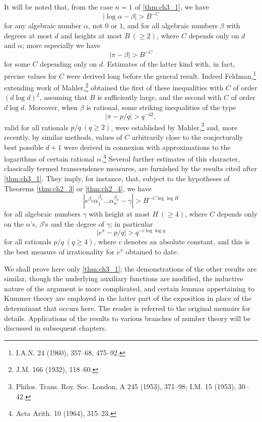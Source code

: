 It will be noted that, from the case $n = 1$ of \autoref{thm:ch3_1}, we have
\[
|\log \alpha - \beta| > B^{-C}
\]
for any algebraic number $\alpha$, not $0$ or $1$, and for all algebraic numbers $\beta$ with degrees at most $d$ and heights at most $B \ (\ge 2)$, where $C$ depends only on $d$ and $\alpha$; more especially we have
\[
|\pi - \beta| > B^{-C}
\]
for some $C$ depending only on $d$. Estimates of the latter kind with, in fact, precise values for $C$ were derived long before the general result. Indeed Feldman,\footnote{I.A.N. 24 (1960), 357--68, 475--92.} extending work of Mahler,\footnote{J.M. 166 (1932), 118--60.} obtained the first of these inequalities with $C$ of order $(d \log d)^2$, assuming that $B$ is sufficiently large, and the second with $C$ of order $d \log d$. Moreover, when $\beta$ is rational, some striking inequalities of the type
\[
|\pi-p/q| > q^{-42},
\]
valid for all rationals $p/q \ (q \ge 2)$, were established by Mahler,\footnote{Philos. Trans. Roy. Soc. London, A 245 (1953), 371--98; I.M. 15 (1953), 30--42.} and, more recently, by similar methods, values of $C$ arbitrarily close to the conjecturally best possible $d+1$ were derived in connexion with approximations to the logarithms of certain rational $\alpha$.\footnote{Acta Arith. 10 (1964), 315--23.} Several further estimates of this character, classically termed transcendence measures, are furnished by the results cited after \autoref{thm:ch3_1}. They imply, for instance, that, subject to the hypotheses of Theorems \ref{thm:ch2_3} or \ref{thm:ch2_4}, we have
\[
|e^{\beta_0}\alpha_1^{\beta_1}\dots\alpha_n^{\beta_n}-\gamma| > H^{-C\log\log H}
\]
for all algebraic numbers $\gamma$ with height at most $H \ (\ge 4)$, where $C$ depends only on the $\alpha$'s, $\beta$'s and the degree of $\gamma$; in particular
\[
|e^\pi - p/q| > q^{-c \log \log q}
\]
for all rationals $p/q \ (q \ge 4)$, where $c$ denotes an absolute constant, and this is the best measure of irrationality for $e^\pi$ obtained to date.

We shall prove here only \autoref{thm:ch3_1}; the demonstrations of the other results are similar, though the underlying auxiliary functions are modified, the inductive nature of the argument is more complicated, and certain lemmas appertaining to Kummer theory are employed in the latter part of the exposition in place of the determinant that occurs here. The reader is referred to the original memoirs for details. Applications of the results to various branches of number theory will be discussed in subsequent chapters.

